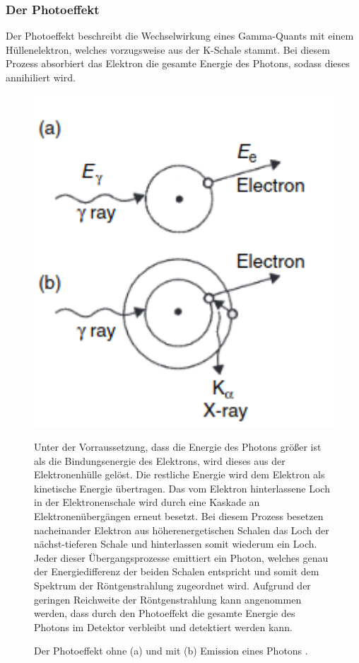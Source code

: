 \subsubsection*{Der Photoeffekt}
Der Photoeffekt beschreibt die Wechselwirkung eines Gamma-Quants mit einem Hüllenelektron, welches vorzugsweise aus der K-Schale stammt.
Bei diesem Prozess absorbiert das Elektron die gesamte Energie des Photons, sodass dieses annihiliert wird.
\FloatBarrier
\begin{figure}[h]
\begin{minipage}[t]{0.4\textwidth}
\vspace{0pt}
\centering
\includegraphics[width=1.1\textwidth]{Photoeffekt.png}
\caption{Der Photoeffekt ohne (a) und mit (b) Emission eines Photons \cite{quelle02}.}
\label{fig:tfig2}
\end{minipage}
\hfill
\begin{minipage}[t]{0.58\textwidth}
\vspace{0pt}
Unter der Vorraussetzung, dass die Energie des Photons größer ist als die Bindungsenergie des Elektrons, wird dieses aus der Elektronenhülle gelöst.
Die restliche Energie wird dem Elektron als kinetische Energie übertragen.
Das vom Elektron hinterlassene Loch in der Elektronenschale wird durch eine Kaskade an Elektronenübergängen erneut besetzt.
Bei diesem Prozess besetzen nacheinander Elektron aus höherenergetischen Schalen das Loch der nächst-tieferen Schale und hinterlassen somit wiederum ein Loch.
Jeder dieser Übergangsprozesse emittiert ein Photon, welches genau der Energiedifferenz der beiden Schalen entspricht und somit dem Spektrum der Röntgenstrahlung zugeordnet wird.
Aufgrund der geringen Reichweite der Röntgenstrahlung kann angenommen werden, dass durch den Photoeffekt die gesamte Energie des Photons im Detektor verbleibt und detektiert werden kann.
\end{minipage}
\end{figure}
\FloatBarrier


